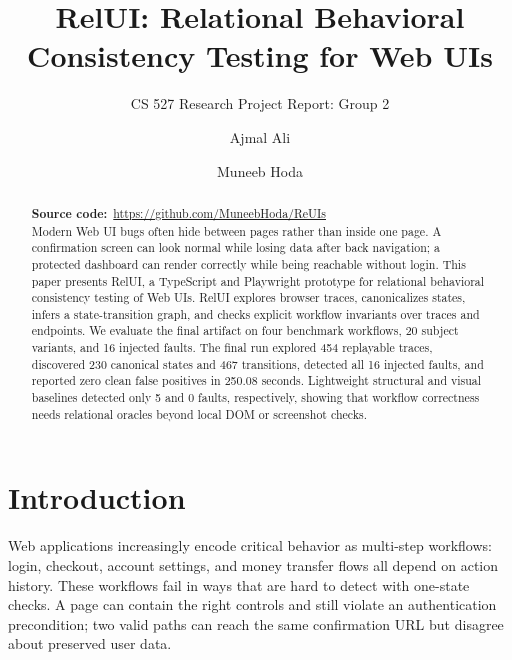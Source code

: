 \documentclass[sigconf,nonacm]{acmart}
\newcommand{\RelUI}{RelUI\xspace}
\begin{document}
\title{RelUI: Relational Behavioral Consistency Testing for Web UIs}
\subtitle{CS 527 Research Project Report: Group 2}

\author{Ajmal Ali}
\author{Muneeb Hoda}

\renewcommand{\shortauthors}{Ali and Hoda}

\begin{abstract}
\noindent\textbf{Source code:}~\url{https://github.com/MuneebHoda/ReUIs}\\[4pt]
Modern Web UI bugs often hide between pages rather than inside one page. A confirmation screen can look normal while losing data after back navigation; a protected dashboard can render correctly while being reachable without login. This paper presents \RelUI, a TypeScript and Playwright prototype for relational behavioral consistency testing of Web UIs. \RelUI explores browser traces, canonicalizes states, infers a state-transition graph, and checks explicit workflow invariants over traces and endpoints. We evaluate the final artifact on four benchmark workflows, 20 subject variants, and 16 injected faults. The final run explored 454 replayable traces, discovered 230 canonical states and 467 transitions, detected all 16 injected faults, and reported zero clean false positives in 250.08 seconds. Lightweight structural and visual baselines detected only 5 and 0 faults, respectively, showing that workflow correctness needs relational oracles beyond local DOM or screenshot checks.
\end{abstract}

\maketitle

\section{Introduction}\label{sec:intro}
Web applications increasingly encode critical behavior as multi-step workflows: login, checkout, account settings, and money transfer flows all depend on action history. These workflows fail in ways that are hard to detect with one-state checks. A page can contain the right controls and still violate an authentication precondition; two valid paths can reach the same confirmation URL but disagree about preserved user data.
\end{document}
